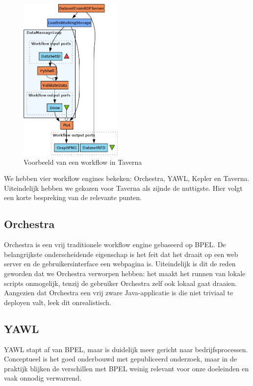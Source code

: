 \documentclass[a4paper]{article}
\begin{document}
\begin{figure}[ht]
  \centering
  \includegraphics[width=2in]{workflow.png}
  \caption{Voorbeeld van een workflow in Taverna}
\end{figure}

We hebben vier workflow engines bekeken: Orchestra, \gls{YAWL}, Kepler en
Taverna. Uiteindelijk hebben we gekozen voor Taverna als zijnde de nuttigste.
Hier volgt een korte bespreking van de relevante punten.

\subsection{Orchestra}

Orchestra is een vrij traditionele workflow engine gebaseerd op \gls{BPEL}. De
belangrijkste onderscheidende eigenschap is het feit dat het draait op een web
server en de gebruikersinterface een webpagina is. Uiteindelijk is dit de reden
geworden dat we Orchestra verworpen hebben: het maakt het runnen van lokale
scripts onmogelijk, tenzij de gebruiker Orchestra zelf ook lokaal gaat draaien.
Aangezien dat Orchestra een vrij zware Java-applicatie is die niet triviaal te
deployen valt, leek dit onrealistisch.

\subsection{\gls{YAWL}}

\gls{YAWL} stapt af van \gls{BPEL}, maar is duidelijk meer gericht naar
bedrijfsprocessen. Conceptueel is het goed onderbouwd met gepubliceerd
onderzoek, maar in de praktijk blijken de verschillen met \gls{BPEL} weinig
relevant voor onze doeleinden en vaak onnodig verwarrend.
\end{document}
